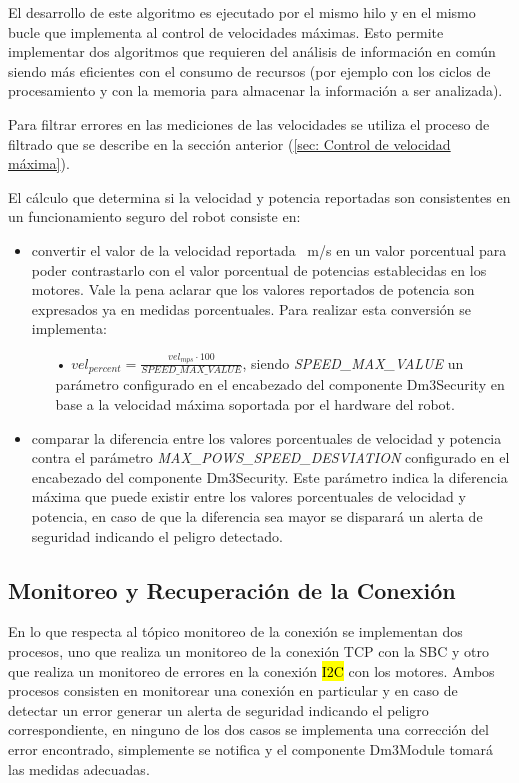 \documentclass[withindex,glossary]{cam-thesis}
\begin{document}
El desarrollo de este algoritmo es ejecutado por el mismo hilo y en el mismo bucle que implementa al control de velocidades máximas. Esto permite implementar dos algoritmos que requieren del análisis de información en común siendo más eficientes con el consumo de recursos (por ejemplo con los ciclos de procesamiento y con la memoria para almacenar la información a ser analizada).

Para filtrar errores en las mediciones de las velocidades se utiliza el proceso de filtrado que se describe en la sección anterior (\ref{sec: Control de velocidad máxima}).

El cálculo que determina si la velocidad y potencia reportadas son consistentes en un funcionamiento seguro del robot consiste en:
\begin{itemize}
\item convertir el valor de la velocidad reportada \SI{}{\metre/\second} en un valor porcentual para poder contrastarlo con el valor porcentual de potencias establecidas en los motores. Vale la pena aclarar que los valores reportados de potencia son expresados ya en medidas porcentuales. Para realizar esta conversión se implementa:
\begin{itemize}
\item[•] $vel_{percent} =  \frac{ vel_{mps}  \cdot  100}{SPEED\_MAX\_VALUE}$, siendo \textit{SPEED\_MAX\_VALUE} un parámetro configurado en el encabezado del componente Dm3Security en base a la velocidad máxima soportada por el hardware del robot.
\end{itemize}
\item comparar la diferencia entre los valores porcentuales de velocidad y potencia contra el parámetro \textit{MAX\_POWS\_SPEED\_DESVIATION} configurado en el encabezado del componente Dm3Security. Este parámetro indica la diferencia máxima que puede existir entre los valores porcentuales de velocidad y potencia, en caso de que la diferencia sea mayor se disparará un alerta de seguridad indicando el peligro detectado.
\end{itemize} 

\subsection{Monitoreo y Recuperación de la Conexión}

En lo que respecta al tópico monitoreo de la conexión se implementan dos procesos, uno que realiza un monitoreo de la conexión TCP con la SBC y otro que realiza un monitoreo de errores en la conexión \hl{I2C} con los motores. Ambos procesos consisten en monitorear una conexión en particular y en caso de detectar un error generar un alerta de seguridad indicando el peligro correspondiente, en ninguno de los dos casos se implementa una corrección del error encontrado, simplemente se notifica y el componente Dm3Module tomará las medidas adecuadas.
\end{document}
